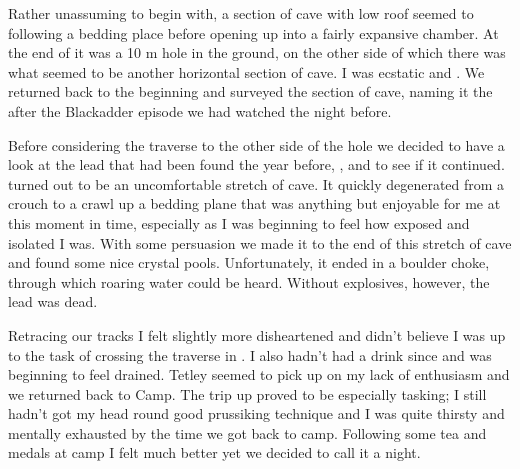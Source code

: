 
Rather unassuming to begin with, a section of cave with low roof seemed
to following a bedding place before opening up into a fairly expansive
chamber. At the end of it was a 10 m hole in the ground, on the other
side of which there was what seemed to be another horizontal section of
cave. I was ecstatic and . We returned
back to the beginning and surveyed the section of cave, naming it the  after the Blackadder episode we had watched the night
before.

Before considering the traverse to the other side of the hole we decided
to have a look at the lead that had been found the year before,
, and to see if it continued.  turned out
to be an uncomfortable stretch of cave. It quickly degenerated from a
crouch to a crawl up a bedding plane that was anything but enjoyable for
me at this moment in time, especially as I was beginning to feel how
exposed and isolated I was. With some persuasion we made it to the end
of this stretch of cave and found some nice crystal pools.
Unfortunately, it ended in a boulder choke, through which roaring water
could be heard. Without explosives, however, the lead was dead.

Retracing our tracks I felt slightly more disheartened and didn't
believe I was up to the task of crossing the traverse in . I also hadn't had a drink since  and was beginning
to feel drained. Tetley seemed to pick up on my lack of enthusiasm and
we returned back to Camp. The trip up  proved to be
especially tasking; I still hadn't got my head round good prussiking
technique and I was quite thirsty and mentally exhausted by the time we
got back to camp. Following some tea and medals at camp I felt much
better yet we decided to call it a night.



